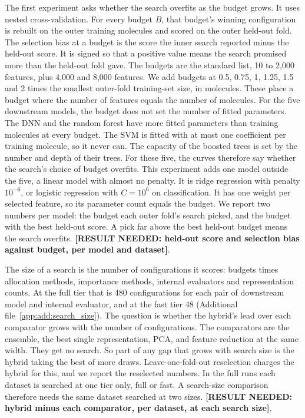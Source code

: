 The first experiment asks whether the search overfits as the budget grows. It uses nested cross-validation. For every budget $B$, that budget's winning configuration is rebuilt on the outer training molecules and scored on the outer held-out fold. The selection bias at a budget is the score the inner search reported minus the held-out score. It is signed so that a positive value means the search promised more than the held-out fold gave. The budgets are the standard list, 10 to 2,000 features, plus 4,000 and 8,000 features. We add budgets at 0.5, 0.75, 1, 1.25, 1.5 and 2 times the smallest outer-fold training-set size, in molecules. These place a budget where the number of features equals the number of molecules. For the five downstream models, the budget does not set the number of fitted parameters. The DNN and the random forest have more fitted parameters than training molecules at every budget. The SVM is fitted with at most one coefficient per training molecule, so it never can. The capacity of the boosted trees is set by the number and depth of their trees. For these five, the curves therefore say whether the search's choice of budget overfits. This experiment adds one model outside the five, a linear model with almost no penalty. It is ridge regression with penalty $10^{-6}$, or logistic regression with $C = 10^{6}$ on classification. It has one weight per selected feature, so its parameter count equals the budget. We report two numbers per model: the budget each outer fold's search picked, and the budget with the best held-out score. A pick far above the best held-out budget means the search overfits. \textbf{[RESULT NEEDED: held-out score and selection bias against budget, per model and dataset]}.

The size of a search is the number of configurations it scores: budgets times allocation methods, importance methods, internal evaluators and representation counts. At the full tier that is 480 configurations for each pair of downstream model and internal evaluator, and at the fast tier 48 (Additional file~\ref{app:add:search_size}). The question is whether the hybrid's lead over each comparator grows with the number of configurations. The comparators are the ensemble, the best single representation, PCA, and feature reduction at the same width. They get no search. So part of any gap that grows with search size is the hybrid taking the best of more draws. Leave-one-fold-out reselection charges the hybrid for this, and we report the reselected numbers. In the full runs each dataset is searched at one tier only, full or fast. A search-size comparison therefore needs the same dataset searched at two sizes. \textbf{[RESULT NEEDED: hybrid minus each comparator, per dataset, at each search size]}.

